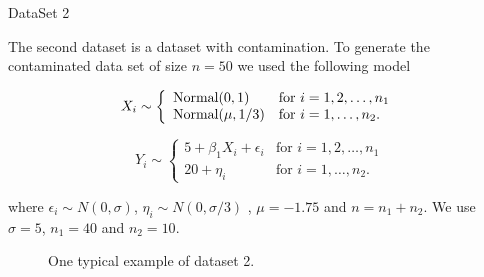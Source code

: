 \documentclass[12]{report}
\begin{document}


\Large{DataSet 2}\\

\normalsize

The second dataset is a dataset with contamination. To generate the contaminated data set of size $n = 50$ we used the following model

\[ X_i \sim \left\{ \begin{array}{ll}
         \hbox{Normal} (0, 1) & \mbox{for $i = 1,2, \dots, n_1$}\\
        \hbox{Normal} (\mu, 1/3) & \mbox{for $i = 1,  \dots, n_2$}.\end{array} \right. \]

\[ Y_i \sim \left\{ \begin{array}{ll}
         5 + \beta_1 X_i + \epsilon_i  & \mbox{for $i = 1,2, \dots, n_1$}\\
         20 + \eta_i & \mbox{for $i = 1, \dots, n_2$}.\end{array} \right. \]
         
where  $\epsilon_i \sim N(0, \sigma)$, $\eta_i \sim N(0, \sigma/3)$ , $\mu = -1.75$ and $n = n_1 + n_2$.  We use $\sigma = 5$, $n_1 = 40$ and $n_2 = 10$. \\      

\begin{figure}[hbtp]
   \centering
       \caption{One typical example of dataset 2.}
       \label{data2}
\end{figure}
        
\end{document}
